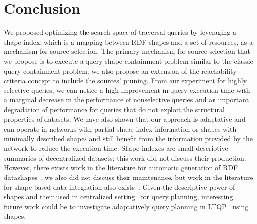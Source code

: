 \section{Conclusion}

We proposed optimizing the search space of traversal queries by leveraging a shape index, which is a mapping between RDF shapes and a set of resources, as a mechanism for source selection.
The primary mechanism for source selection that we propose is to execute a query-shape containment problem similar to the classic query containment problem; we also 
propose an extension of the reachability criteria concept to include the sources' pruning.
From our experiment for highly selective queries, we can notice a high improvement in query execution time with a marginal decrease in the performance of nonselective queries 
and an important degradation of performance for queries that do not exploit the structural properties of datasets.
We have also shown that our approach is adaptative and can operate in networks with partial shape index information or shapes with minimally described shapes and still benefit
from the information provided by the network to reduce the execution time.
Shape indexes are small descriptive summaries of decentralized datasets; this work did not discuss their production. However,
there exists work in the literature for automatic generation of RDF datashapes~\cite{fernandez2023extracting}, we also 
did not discuss their maintenance, but work in the literature for shape-based data integration also exists~\cite{LabraGayo2023}.
Given the descriptive power of shapes and their used in centralized setting~\cite{kashif2021} for query planning, interesting future work could be to investigate adaptatively
query planning in LTQP~\cite{taelman2024towards} using shapes.   